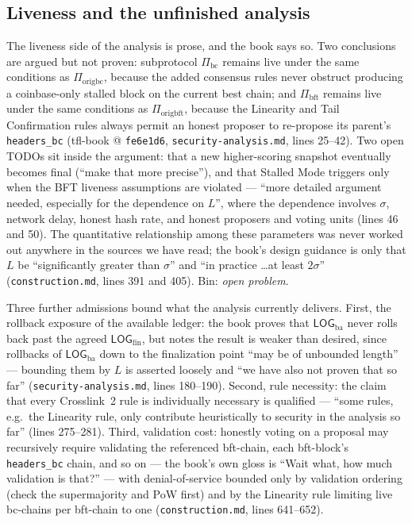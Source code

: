 \documentclass[11pt,a4paper]{article}
\theoremstyle{definition}
\begin{document}
\subsection{Liveness and the unfinished analysis}\label{sec:xl-liveness}

The liveness side of the analysis is prose, and the book says so. Two
conclusions are argued but not proven: subprotocol $\Pi_{\mathrm{bc}}$
remains live under the same conditions as $\Pi_{\mathrm{origbc}}$, because
the added consensus rules never obstruct producing a coinbase-only stalled
block on the current best chain; and $\Pi_{\mathrm{bft}}$ remains live
under the same conditions as $\Pi_{\mathrm{origbft}}$, because the
Linearity and Tail Confirmation rules always permit an honest proposer to
re-propose its parent's \texttt{headers\_bc} (tfl-book @ \texttt{fe6e1d6},
\texttt{security-analysis.md}, lines 25--42). Two open TODOs sit inside
the argument: that a new higher-scoring snapshot eventually becomes final
(``make that more precise''), and that Stalled Mode triggers only when the
BFT liveness assumptions are violated --- ``more detailed argument needed,
especially for the dependence on $L$'', where the dependence involves
$\sigma$, network delay, honest hash rate, and honest proposers and voting
units (lines 46 and 50). The quantitative relationship among these
parameters was never worked out anywhere in the sources we have read; the
book's design guidance is only that $L$ be ``significantly greater than
$\sigma$'' and ``in practice \ldots at least $2\sigma$''
(\texttt{construction.md}, lines 391 and 405). Bin: \emph{open problem}.

Three further admissions bound what the analysis currently delivers.
First, the rollback exposure of the available ledger: the book proves that
$\mathsf{LOG}_{\mathrm{ba}}$ never rolls back past the agreed
$\mathsf{LOG}_{\mathrm{fin}}$, but notes the result is weaker than
desired, since rollbacks of $\mathsf{LOG}_{\mathrm{ba}}$ down to the
finalization point ``may be of unbounded length'' --- bounding them by $L$
is asserted loosely and ``we have also not proven that so far''
(\texttt{security-analysis.md}, lines 180--190). Second, rule necessity:
the claim that every Crosslink~2 rule is individually necessary is
qualified --- ``some rules, e.g.\ the Linearity rule, only contribute
heuristically to security in the analysis so far'' (lines 275--281).
Third, validation cost: honestly voting on a proposal may recursively
require validating the referenced bft-chain, each bft-block's
\texttt{headers\_bc} chain, and so on --- the book's own gloss is ``Wait
what, how much validation is that?'' --- with denial-of-service bounded
only by validation ordering (check the supermajority and PoW first) and by
the Linearity rule limiting live bc-chains per bft-chain to one
(\texttt{construction.md}, lines 641--652).
\end{document}
